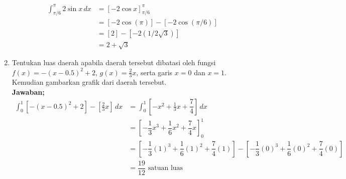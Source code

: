 \begin{enumerate}
\begin{align*}
		\int_{\pi/6}^{\pi}2 \sin x \,dx  &= \left[-2 \cos x \right]_{\pi/6}^{\pi} \\
		&= [-2 \cos (\pi)]-[-2 \cos (\pi/6)] \\
		&= [2]-[-2(1/2\sqrt{3})]\\
		&= 2+\sqrt{3}
	\end{align*} 
	\item Tentukan luas daerah apabila daerah tersebut dibatasi oleh fungsi $ {\displaystyle f(x)=-(x-0.5)^2+2 }$, $ {\displaystyle g(x)=\frac{2}{3}x}$, serta garis $ x=0 $ dan $ x=1 $. Kemudian gambarkan grafik dari daerah tersebut.\\ %
	\textbf{Jawaban;}
	\begin{align*}
		\int_{0}^{1}\left[ -(x-0.5)^2+2 \right] - \left[ \frac{2}{3}x\right] \,dx &=\int_{0}^{1}\left[ -x^2 + \frac{1}{3}x+\dfrac{7}{4} \right] \,dx\\
		&= \left[-\dfrac{1}{3}x^3 + \dfrac{1}{6}x^2 +\dfrac{7}{4}x \right]_{0}^{1} \\
		&= \left[-\dfrac{1}{3}(1)^3 + \dfrac{1}{6}(1)^2 +\dfrac{7}{4}(1) \right]- \left[-\dfrac{1}{3}(0)^3 + \dfrac{1}{6}(0)^2 +\dfrac{7}{4}(0) \right] \\
		&= \dfrac{19}{12} \text{ satuan luas}
	\end{align*} 
\end{enumerate}
